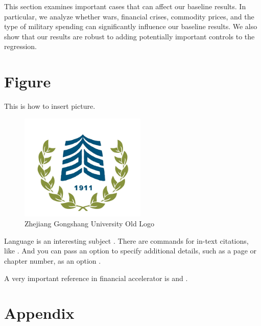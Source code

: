 \documentclass{ZJSUthesis}
\begin{document}
This section examines important cases that can affect our baseline results. In particular, we analyze
whether wars, financial crises, commodity prices, and the type of military spending can significantly
influence our baseline results. We also show that our results are robust to adding potentially
important controls to the regression.

\section{Figure}

This is how to insert picture.
\begin{figure}[!h]
  \begin{center}
  \centering
  \includegraphics[width= 6cm]{picture/ZJSU_logo}
  \caption{Zhejiang Gongshang University Old Logo}\label{zlog}
  \end{center}
\end{figure}


 Language is an interesting subject \citep{TM83}.  There are commands for in-text citations, like \citet{GMP81}. And you can pass an option to specify additional details, such as a page or chapter number, as an option \citep[p. 130]{Ful83}.

   A very important reference in financial accelerator is \citep{BGG99} and \citet*{BGG99}.





\newpage
\renewcommand\refname{Reference}
\makeatletter\renewcommand{\@biblabel}[1]{[#1].}\makeatother
{}

%
%



\newpage
\appendix
\section*{Appendix}

\newpage
\end{document}
